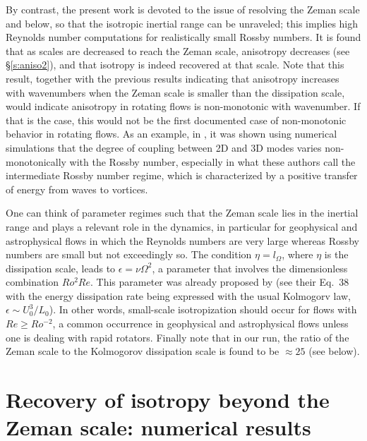\documentclass[aps,amsmath,amssymb,floatfix,showpacs]{revtex4}
\begin{document}
By contrast, the present work is devoted to the issue of resolving the Zeman scale and below, so that the isotropic inertial range can be unraveled; this implies high Reynolds number computations for realistically small Rossby numbers. It is found that as scales are decreased to reach the Zeman scale, anisotropy decreases (see \S \ref{s:aniso2}), and that isotropy is indeed recovered at that scale. {Note that this result, together with the previous results indicating that anisotropy increases with wavenumbers when the Zeman scale is smaller than the dissipation scale, would indicate anisotropy in rotating flows is non-monotonic with wavenumber. If that is the case, this would not be} the first documented case of non-monotonic behavior in rotating flows. As an example, in \cite{bourouiba}, it was shown using numerical simulations that the degree of coupling between 2D and 3D modes varies non-monotonically with the Rossby number, especially in what these authors call the intermediate Rossby number regime, which is characterized by a positive transfer of energy from waves to vortices.

One can think of parameter regimes such that the Zeman scale lies in the inertial range and plays a relevant role in the dynamics, in particular for geophysical and astrophysical flows in which the Reynolds numbers are very large whereas Rossby numbers are small but not exceedingly so. The condition $\eta=l_{\Omega}$, where $\eta$ is the dissipation scale, leads to $\epsilon = \nu \Omega^2$, a parameter that involves the dimensionless combination $Ro^2 Re$. This parameter was already proposed by \cite{canuto} (see their Eq.~38 with the energy dissipation rate being expressed with the usual Kolmogorv law, $\epsilon\sim U_0^3/L_0$). In other words, small-scale isotropization should occur for flows with $Re \ge Ro^{-2}$, a common occurrence in geophysical and astrophysical flows unless one is dealing with rapid rotators. Finally note that  in our run, the ratio of the Zeman scale to the Kolmogorov dissipation scale is found to be $\approx 25$ (see below).

\section{Recovery of isotropy beyond the Zeman scale: numerical results} \label{s:res}
\end{document}
